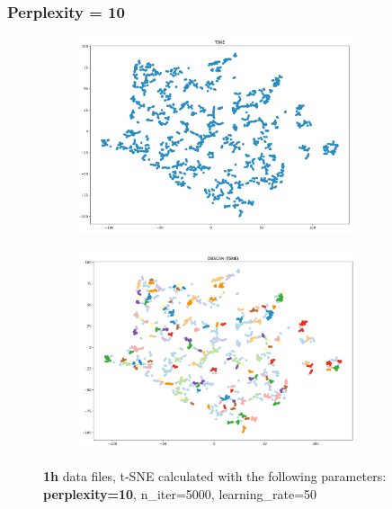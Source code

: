 \subsubsection{Perplexity = 10}
\begin{figure}[H]
  \centering
  \begin{subfigure}{.5\textwidth}
    \centering
    \includegraphics[width=0.9\textwidth]{./images/tsneParametersTest/perplexity/perp10-1hTSNE.png}
  \end{subfigure}%
  \begin{subfigure}{.5\textwidth}
    \centering
    \includegraphics[width=0.9\textwidth]{./images/tsneParametersTest/perplexity/perp10-1hDBSCAN.png}
  \end{subfigure}
	\caption{\textbf{1h} data files, t-SNE calculated with the following parameters: \textbf{perplexity=10}, n\_iter=5000, learning\_rate=50}
  \label{figure:1hperp10TSNE}
\end{figure}

